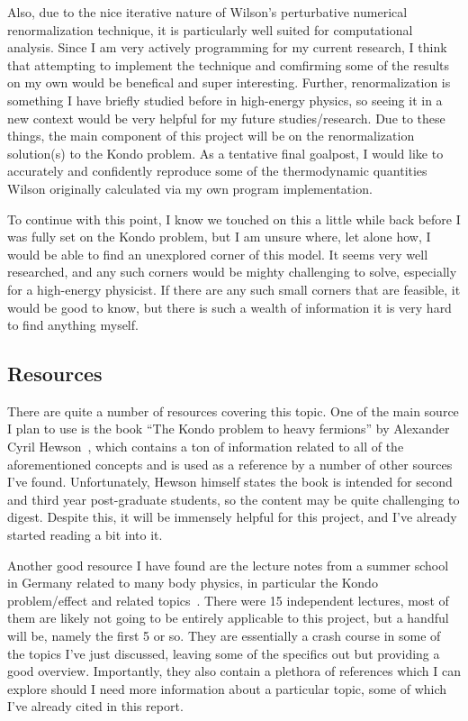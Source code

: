Also, due to the nice iterative nature of Wilson's perturbative numerical renormalization technique, it is particularly well suited for computational analysis. Since I am very actively programming for my current research, I think that attempting to implement the technique and comfirming some of the results on my own would be benefical and super interesting. Further, renormalization is something I have briefly studied before in high-energy physics, so seeing it in a new context would be very helpful for my future studies/research. Due to these things, the main component of this project will be on the renormalization solution(s) to the Kondo problem. As a tentative final goalpost, I would like to accurately and confidently reproduce some of the thermodynamic quantities Wilson originally calculated via my own program implementation.

To continue with this point, I know we touched on this a little while back before I was fully set on the Kondo problem, but I am unsure where, let alone how, I would be able to find an unexplored corner of this model. It seems very well researched, and any such corners would be mighty challenging to solve, especially for a high-energy physicist. If there are any such small corners that are feasible, it would be good to know, but there is such a wealth of information it is very hard to find anything myself.

\subsection{Resources}

There are quite a number of resources covering this topic. One of the main source I plan to use is the book ``The Kondo problem to heavy fermions'' by Alexander Cyril Hewson~\cite{Hewson_1993}, which contains a ton of information related to all of the aforementioned concepts and is used as a reference by a number of other sources I've found. Unfortunately, Hewson himself states the book is intended for second and third year post-graduate students, so the content may be quite challenging to digest. Despite this, it will be immensely helpful for this project, and I've already started reading a bit into it.

Another good resource I have found are the lecture notes from a summer school in Germany related to many body physics, in particular the Kondo problem/effect and related topics~\cite{manybodyphys_2015}. There were 15 independent lectures, most of them are likely not going to be entirely applicable to this project, but a handful will be, namely the first 5 or so. They are essentially a crash course in some of the topics I've just discussed, leaving some of the specifics out but providing a good overview. Importantly, they also contain a plethora of references which I can explore should I need more information about a particular topic, some of which I've already cited in this report.

